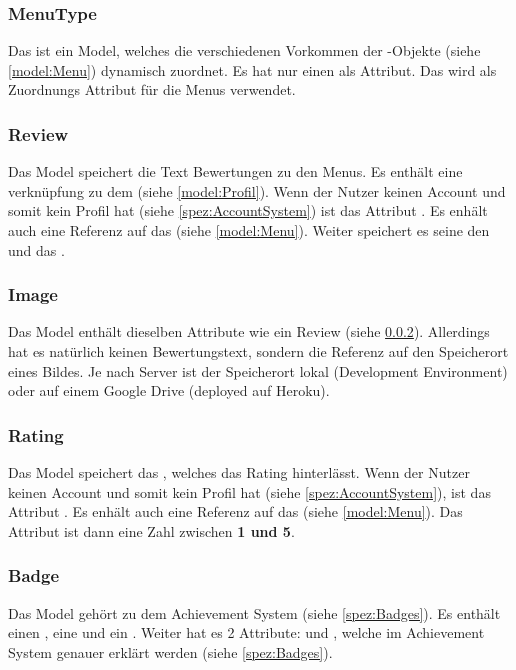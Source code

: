 \subsubsection{MenuType}\label{model:MenuType} Das  ist ein
Model, welches die verschiedenen Vorkommen der -Objekte (siehe
\ref{model:Menu}) dynamisch zuordnet. Es hat nur einen  als Attribut. Das
wird als Zuordnungs Attribut für die Menus verwendet.

\subsubsection{Review}\label{model:Review} Das  Model speichert die
Text Bewertungen zu den Menus. Es enthält eine verknüpfung zu dem 
(siehe \ref{model:Profil}). Wenn der Nutzer keinen Account und somit kein Profil
hat (siehe \ref{spez:AccountSystem}) ist das Attribut . Es enhält
auch eine Referenz auf das  (siehe \ref{model:Menu}). Weiter
speichert es seine  den  und das .

\subsubsection{Image}\label{model:Image} Das  Model enthält
dieselben Attribute wie ein Review (siehe \ref{model:Review}). Allerdings hat es
natürlich keinen Bewertungstext, sondern die Referenz auf den Speicherort eines
Bildes. Je nach Server ist der Speicherort lokal (Development Environment) oder
auf einem Google Drive (deployed auf Heroku).

\subsubsection{Rating}\label{model:Rating} Das  Model speichert das
, welches das Rating hinterlässt. Wenn der Nutzer keinen Account
und somit kein Profil hat (siehe \ref{spez:AccountSystem}), ist das Attribut
. Es enhält auch eine Referenz auf das  (siehe
\ref{model:Menu}). Das Attribut  ist dann eine Zahl zwischen
\textbf{1 und 5}.

\subsubsection{Badge}\label{model:Badge} Das  Model gehört zu dem
Achievement System (siehe \ref{spez:Badges}). Es enthält einen ,
eine  und ein . Weiter hat es 2 Attribute:
 und , welche im Achievement System genauer
erklärt werden (siehe \ref{spez:Badges}).

